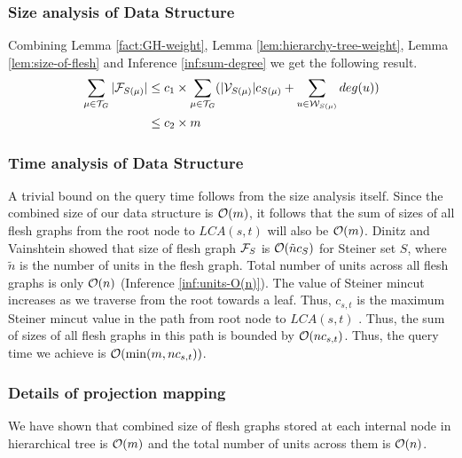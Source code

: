 \subsubsection*{Size analysis of Data Structure}
Combining Lemma \ref{fact:GH-weight}, Lemma \ref{lem:hierarchy-tree-weight}, Lemma \ref{lem:size-of-flesh} and Inference \ref{inf:sum-degree} we get the following result.
\begin{equation*}
    \begin{split}
        \nonumber
        \sum_{\mu \in {\cal T}_G}|{\cal F}_{S(\mu)}| &\leq c_1 \times \sum_{\mu \in {\cal T}_G} (|{\cal V}_{S(\mu)}|c_{S(\mu)} + \sum_{u\in {\cal W}_{S(\mu)}}deg(u))\\
        &\leq c_2 \times m
    \end{split}
\end{equation*}


\subsubsection*{Time analysis of Data Structure}

A trivial bound on the query time follows from the size analysis itself. Since the combined size of our data structure is ${\cal O}(m)$, it follows that the sum of sizes of all flesh graphs from the root node to $LCA(s,t)$ will also be ${\cal O}(m)$. Dinitz and Vainshtein \cite{DBLP:conf/stoc/DinitzV94} showed that size of flesh graph ${\cal F}_S$ is ${\cal O}(\tilde{n}c_S)$ for Steiner set $S$, where $\tilde{n}$ is the number of units in the flesh graph. Total number of units across all flesh graphs is only ${\cal O}(n)$ (Inference \ref{inf:units-O(n)}). The value of Steiner mincut increases as we traverse from the root towards a leaf. Thus, $c_{s,t}$ is the maximum Steiner mincut value in the path from root node to $LCA(s,t)$ . Thus, the sum of sizes of all flesh graphs in this path is bounded by ${\cal O}(nc_{s,t})$. Thus, the query time we achieve is ${\cal O}(\min(m,nc_{s,t}))$.


\subsubsection*{Details of projection mapping}

We have shown that combined size of flesh graphs stored at each internal node in hierarchical tree is ${\cal O}(m)$ and the total number of units across them is ${\cal O}(n)$.


